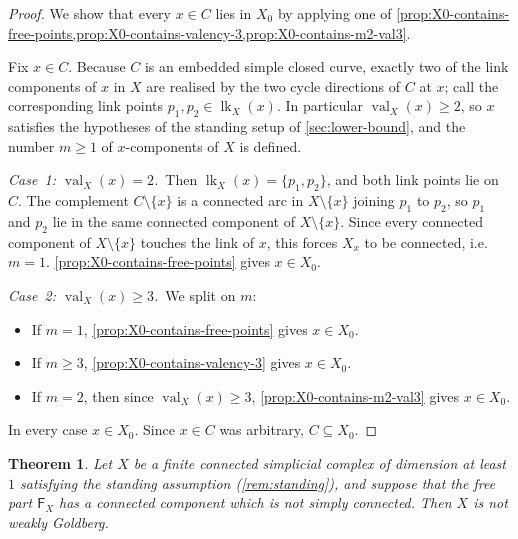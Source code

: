 \documentclass[reqno]{amsart}
\newtheorem{theorem}{Theorem}[section]
\theoremstyle{definition}
\DeclareMathOperator{\lk}{lk}
\DeclareMathOperator{\val}{val}
\numberwithin{equation}{section}
\begin{document}
\begin{proof}
We show that every \(x\in C\) lies in \(X_0\) by applying one of
\cref{prop:X0-contains-free-points,prop:X0-contains-valency-3,prop:X0-contains-m2-val3}.

Fix \(x\in C\). Because \(C\) is an embedded simple closed curve,
exactly two of the link components of \(x\) in \(X\) are realised by the
two cycle directions of \(C\) at \(x\); call the corresponding link
points \(p_1,p_2\in\lk_{X}(x)\). In particular \(\val_{X}(x)\geq 2\), so \(x\) satisfies the
hypotheses of the standing setup of \cref{sec:lower-bound}, and
the number \(m\geq 1\) of \(x\)-components of \(X\) is defined.

\smallskip
\noindent\emph{Case~1: \(\val_{X}(x)=2\).}\ Then \(\lk_{X}(x)=\{p_1,p_2\}\),
and both link points lie on \(C\). The complement \(C\setminus\{x\}\) is
a connected arc in \(X\setminus\{x\}\) joining \(p_1\) to \(p_2\), so \(p_1\)
and \(p_2\) lie in the same connected component of \(X\setminus\{x\}\).
Since every connected component of \(X\setminus\{x\}\) touches the link
of \(x\), this forces \(X_x\) to be connected, i.e.\ \(m=1\).
\cref{prop:X0-contains-free-points} gives \(x\in X_0\).

\smallskip
\noindent\emph{Case~2: \(\val_{X}(x)\geq 3\).}\ We split on \(m\):
\begin{itemize}[leftmargin=2em]
  \item If \(m=1\), \cref{prop:X0-contains-free-points}
        gives \(x\in X_0\).
  \item If \(m\geq 3\), \cref{prop:X0-contains-valency-3}
        gives \(x\in X_0\).
  \item If \(m=2\), then since \(\val_{X}(x)\geq 3\),
        \cref{prop:X0-contains-m2-val3} gives \(x\in X_0\).
\end{itemize}

In every case \(x\in X_0\). Since \(x\in C\) was arbitrary, \(C\subseteq X_0\).
\end{proof}

\begin{theorem}\label{thm:F-cycle-obstruction}
Let \(X\) be a finite connected simplicial complex of dimension at
least \(1\) satisfying the standing assumption
(\cref{rem:standing}), and suppose that the free part
\(\mathsf{F}_X\) has a connected component which is not simply
connected. Then \(X\) is not weakly Goldberg.
\end{theorem}
\end{document}
